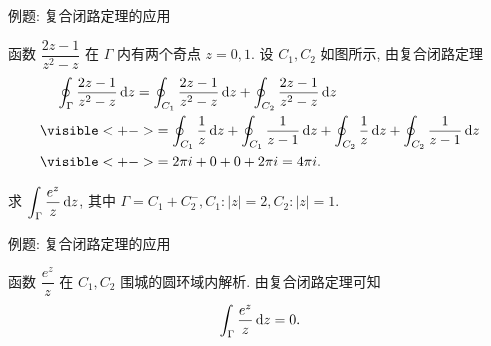 \begin{frame}{例题: 复合闭路定理的应用}
\begin{solution}
函数 $\dfrac{2z-1}{z^2-z}$ 在 $\Gamma$ 内有两个奇点 $z=0,1$.
\onslide<+->
设 $C_1,C_2$ 如图所示,
\onslide<+->
由复合闭路定理
\begin{align*}
&\peq\oint_\Gamma\frac{2z-1}{z^2-z}\diff z
=\oint_{C_1}\frac{2z-1}{z^2-z}\diff z+\oint_{C_2}\frac{2z-1}{z^2-z}\diff z\\
&\visible<+->{=\oint_{C_1}\frac1z\diff z+\oint_{C_1}\frac1{z-1}\diff z
+\oint_{C_2}\frac1z\diff z+\oint_{C_2}\frac1{z-1}\diff z}\\
&\visible<+->{=2\pi i+0+0+2\pi i=4\pi i.}
\end{align*}
\end{solution}

\begin{example}
求 $\displaystyle\int_\Gamma\frac{e^z}z\,\mathrm{d} z$, 其中 $\Gamma=C_1+C_2^-,C_1:|z|=2,C_2:|z|=1$.
\end{example}
\end{frame}


\begin{frame}{例题: 复合闭路定理的应用}
\begin{solution}
\begin{center}
\end{center}
\onslide<+->
函数 $\dfrac{e^z}z$ 在 $C_1,C_2$ 围城的圆环域内解析.
\onslide<+->
由复合闭路定理可知 
\[\int_\Gamma\frac{e^z}z\,\mathrm{d} z=0.\]
\end{solution}
\end{frame}

